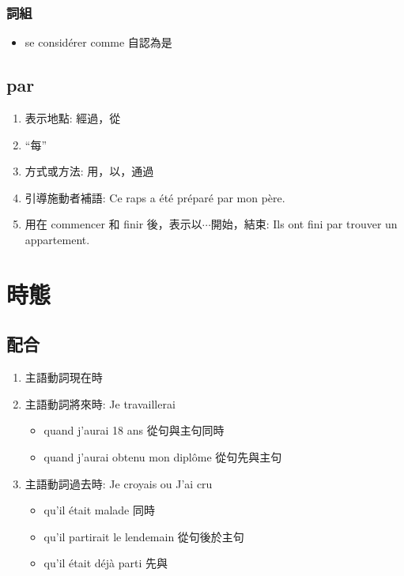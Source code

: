 \documentclass{book}
\begin{document}
        \subsection{詞組}
            \begin{itemize}
                \item se considérer comme 自認為是
            \end{itemize}

    \section{par}
        \begin{enumerate}
            \item 表示地點: 經過，從
            \item ``每''
            \item 方式或方法: 用，以，通過
            \item 引導施動者補語: Ce raps a été préparé par mon père.
            \item 用在 commencer 和 finir 後，表示以$\cdots$開始，結束: Ils ont fini par trouver un appartement.
        \end{enumerate}

\chapter{時態}
    \section{配合}
        \begin{enumerate}
            \item 主語動詞現在時
            \item 主語動詞將來時: Je travaillerai
                \begin{itemize}
                    \item quand j'aurai 18 ans 從句與主句同時
                    \item quand j'aurai obtenu mon diplôme 從句先與主句
                \end{itemize}
            \item 主語動詞過去時: Je croyais ou J'ai cru
                \begin{itemize}
                    \item qu'il était malade 同時
                    \item qu'il partirait le lendemain 從句後於主句
                    \item qu'il était déjà parti 先與
                \end{itemize}
        \end{enumerate}
    
\end{document}
